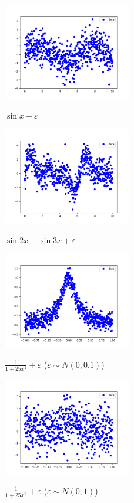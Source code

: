\documentclass[../main.tex]{subfiles}
\begin{document}
\begin{figure}[ht]
\caption{$\sin{x} + \varepsilon$}
\includegraphics[width=0.5\textwidth]{Immagini/Introduzione/seno.png}
\centering
\label{fig:seno}
\end{figure}

\begin{figure}[ht]
\caption{$\sin{2x} + \sin{3x} + \varepsilon$}
\includegraphics[width=0.5\textwidth]{Immagini/Introduzione/seno_complesso.png}
\centering
\label{fig:seno_complesso}
\end{figure}

\begin{figure}[ht]
\caption{$\frac{1}{1+25x^2} + \varepsilon$ ($\varepsilon\sim N(0,0.1) $)}
\includegraphics[width=0.5\textwidth]{Immagini/Introduzione/runge.png}
\centering
\label{fig:runge}
\end{figure}

\begin{figure}[ht]
\caption{$\frac{1}{1+25x^2}+ \varepsilon$ ($\varepsilon\sim N(0,1) $)}
\includegraphics[width=0.5\textwidth]{Immagini/Introduzione/runge_rumoroso.png}
\centering
\label{fig:runge_rumoroso}
\end{figure}
\end{document}
